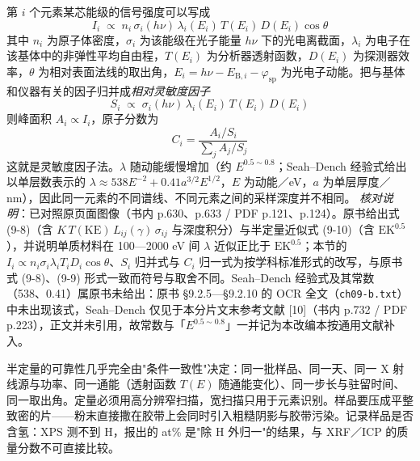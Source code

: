 \begin{principle}
第 $i$ 个元素某芯能级的信号强度可以写成
\begin{equation}
I_i \;\propto\; n_i\,\sigma_i(h\nu)\,\lambda_i(E_i)\,T(E_i)\,D(E_i)\cos\theta
\label{eq:ch09-quant-int}
\end{equation}
其中 $n_i$ 为原子体密度，$\sigma_i$ 为该能级在光子能量 $h\nu$ 下的光电离截面，$\lambda_i$ 为电子在该基体中的非弹性平均自由程，$T(E_i)$ 为分析器透射函数，$D(E_i)$ 为探测器效率，$\theta$ 为相对表面法线的取出角，$E_i = h\nu - E_{\mathrm{B},i} - \varphi_{\mathrm{sp}}$ 为光电子动能。把与基体和仪器有关的因子归并成\emph{相对灵敏度因子}
\begin{equation}
S_i \;\propto\; \sigma_i(h\nu)\,\lambda_i(E_i)\,T(E_i)\,D(E_i)
\label{eq:ch09-rsf}
\end{equation}
则峰面积 $A_i \propto I_i$，原子分数为
\begin{equation}
C_i = \frac{A_i/S_i}{\sum_j A_j/S_j}
\label{eq:ch09-atomfrac}
\end{equation}
这就是灵敏度因子法。$\lambda$ 随动能缓慢增加（约 $E^{0.5\sim0.8}$；Seah--Dench 经验式给出以单层数表示的 $\lambda \approx 538E^{-2}+0.41a^{3/2}E^{1/2}$，$E$ 为动能／eV，$a$ 为单层厚度／nm），因此同一元素的不同谱线、不同元素之间的采样深度并不相同。
\emph{核对说明}：已对照原页面图像（书内 p.630、p.633 / PDF p.121、p.124）。原书给出式 (9-8)（含 $K\,T(\mathrm{KE})\,L_{ij}(\gamma)\,\sigma_{ij}$ 与深度积分）与半定量近似式 (9-10)（含 $\mathrm{EK}^{0.5}$），并说明单质材料在 100—2000 eV 间 $\lambda$ 近似正比于 $\mathrm{EK}^{0.5}$；本节的 $I_i \propto n_i\sigma_i\lambda_i T_i D_i\cos\theta$、$S_i$ 归并式与 $C_i$ 归一式为按学科标准形式的改写，与原书式 (9-8)、(9-9) 形式一致而符号与取舍不同。Seah--Dench 经验式及其常数（538、0.41）属原书未给出：原书 §9.2.5—§9.2.10 的 OCR 全文（\texttt{ch09-b.txt}）中未出现该式，Seah--Dench 仅见于本分片文末参考文献 [10]（书内 p.732 / PDF p.223），正文并未引用，故常数与「$E^{0.5\sim0.8}$」一并记为本改编本按通用文献补入。
\end{principle}

\begin{measure}
半定量的可靠性几乎完全由"条件一致性"决定：同一批样品、同一天、同一 X 射线源与功率、同一通能（透射函数 $T(E)$ 随通能变化）、同一步长与驻留时间、同一取出角。定量必须用高分辨窄扫描，宽扫描只用于元素识别。样品要压成平整致密的片——粉末直接撒在胶带上会同时引入粗糙阴影与胶带污染。记录样品是否含氢：XPS 测不到 H，报出的 at\% 是"除 H 外归一"的结果，与 XRF／ICP 的质量分数不可直接比较。
\end{measure}

